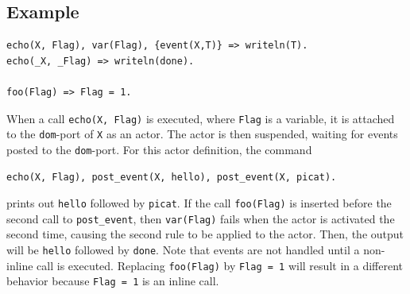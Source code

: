 \subsection*{Example}
\begin{verbatim}
echo(X, Flag), var(Flag), {event(X,T)} => writeln(T).
echo(_X, _Flag) => writeln(done).

foo(Flag) => Flag = 1.
\end{verbatim}
When a call \texttt{echo(X, Flag)} is executed, where \texttt{Flag} is a variable, it is attached to the \texttt{dom}-port of \texttt{X} as an actor.  The actor is then suspended, waiting for events posted to the \texttt{dom}-port. For this actor definition, the command
\begin{small}
\begin{verbatim}
echo(X, Flag), post_event(X, hello), post_event(X, picat).
\end{verbatim}
\end{small}
prints out \texttt{hello} followed by \texttt{picat}. If the call \texttt{foo(Flag)} is inserted before the second call to \texttt{post\_event}, then \texttt{var(Flag)} fails when the actor is activated the second time, causing the second rule to be applied to the actor. Then, the output will be \texttt{hello} followed by \texttt{done}. Note that events are not handled until a non-inline call is executed. Replacing \texttt{foo(Flag)} by \texttt{Flag = 1} will result in a different behavior because \texttt{Flag = 1} is an inline call.


